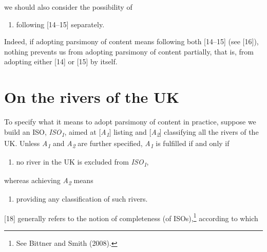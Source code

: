 we should also consider the possibility of



\begin{enumerate}

\item following [14–15] separately.

\end{enumerate}

Indeed, if adopting parsimony of content means following both [14–15] (see [16]), nothing prevents us from adopting parsimony of content partially, that is, from adopting either [14] or [15] by itself.



\section{On the rivers of the UK}

To specify what it means to adopt parsimony of content in practice, suppose we build an ISO, \textit{ISO}\textit{\textsubscript{1}}, aimed at [\textit{A}\textit{\textsubscript{1}}] listing and [\textit{A}\textit{\textsubscript{2}}] classifying all the rivers of the UK. Unless \textit{A}\textit{\textsubscript{1}} and \textit{A}\textit{\textsubscript{2}} are further specified, \textit{A}\textit{\textsubscript{1}} is fulfilled if and only if



\begin{enumerate}

\item no river in the UK is excluded from \textit{ISO}\textit{\textsubscript{1}},

\end{enumerate}

whereas achieving \textit{A}\textit{\textsubscript{2}} means



\setcounter{saveenum}{\value{enumi}}

\begin{enumerate}

\setcounter{enumi}{\value{saveenum}}

\item providing any classification of such rivers.

\end{enumerate}

[18] generally refers to the notion of completeness (of ISOs),\footnote{See Bittner and Smith (2008).} according to which



